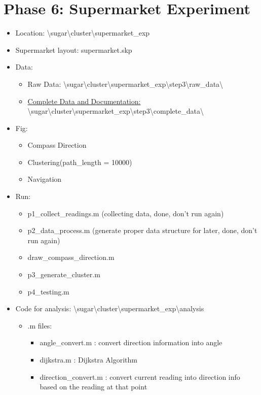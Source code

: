 \documentclass{article}
\begin{document}
\section{Phase 6: Supermarket Experiment}
\begin{itemize}
\item Location: \textbackslash sugar\textbackslash cluster\textbackslash supermarket\_exp
\item Supermarket layout: supermarket.skp
\item Data: 
	\begin{itemize}
	\item Raw Data: \textbackslash sugar\textbackslash cluster\textbackslash supermarket\_exp\textbackslash step3\textbackslash raw\_data\textbackslash
	\item \underline{\Large{Complete Data and Documentation:}}  \textbackslash sugar\textbackslash cluster\textbackslash supermarket\_exp\textbackslash step3\textbackslash complete\_data\textbackslash
	\end{itemize}
\item Fig:
	\begin{itemize}
	\item Compass Direction
	\item Clustering(path\_length = 10000) 
	\item Navigation
	\end{itemize}
\item Run: 
	\begin{itemize}
	\item p1\_collect\_readings.m (collecting data, done, don't run again)
	\item p2\_data\_process.m (generate proper data structure for later, done, don't run again)
	\item draw\_compass\_direction.m
	\item p3\_generate\_cluster.m 
	\item p4\_testing.m
	\end{itemize} 
\item Code for analysis: \textbackslash sugar\textbackslash cluster\textbackslash supermarket\_exp\textbackslash analysis
	\begin{itemize}
	\item .m files:
		\begin{itemize}
		\item angle\_convert.m : convert direction information into angle
		\item dijkstra.m : Dijkstra Algorithm
		\item direction\_convert.m : convert current reading into direction info based on the reading at that point

\end{itemize}
\end{itemize}
\end{itemize}
\end{document}
